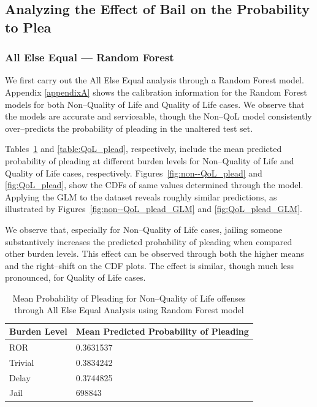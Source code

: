 \subsection{Analyzing the Effect of Bail on the Probability to Plea}
\subsubsection{All Else Equal --- Random Forest}
We first carry out the All Else Equal analysis through a Random Forest model.
Appendix \ref{appendixA} shows the calibration information for the Random Forest models for both
Non--Quality of Life and
Quality of Life cases.
We observe that the models are accurate and serviceable,
though the Non--QoL model consistently over--predicts the probability of pleading in the unaltered test set.

Tables~\ref{table:non--QoL_plead} and
       \ref{table:QoL_plead},
respectively,
include the mean predicted probability of pleading at different burden levels for
Non--Quality of Life and
Quality of Life cases, respectively.
Figures~\ref{fig:non--QoL_plead} and
        \ref{fig:QoL_plead}, show the CDFs of same values determined through the model.
Applying the GLM to the dataset reveals roughly similar predictions, as illustrated by
Figures~\ref{fig:non--QoL_plead_GLM} and
        \ref{fig:QoL_plead_GLM}.


We observe that,
especially for Non--Quality of Life cases,
jailing someone substantively increases the predicted probability of pleading when compared other burden levels.
This effect can be observed through both the higher means and the right--shift on the CDF plots.
The effect is similar, though much less pronounced, for Quality of Life cases.

\begin{table}
\centering
\begin{tabular}{|p{}|p{}|}
  \hline
\textbf{Burden Level} & \textbf{Mean Predicted Probability of Pleading} \\ \hline
    ROR & 0.3631537 \\ \hline
    Trivial & 0.3834242 \\ \hline
    Delay & 0.3744825 \\ \hline
    Jail & 698843  \\ \hline
  \end{tabular}
  \caption{Mean Probability of Pleading for Non--Quality of Life offenses through All Else Equal Analysis using Random Forest model}
  \label{table:non--QoL_plead}
\end{table}

